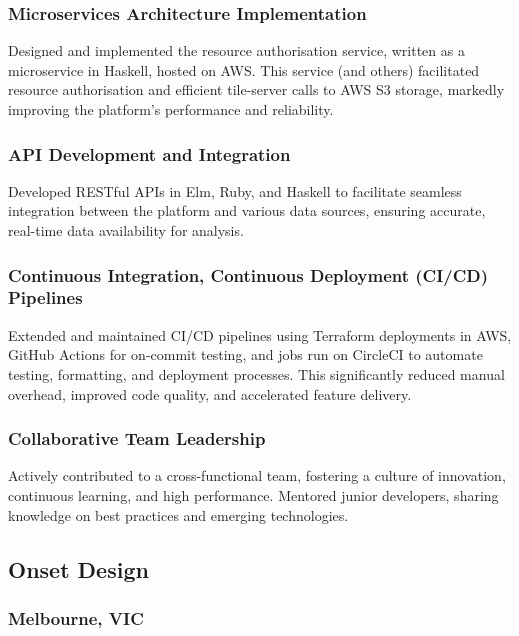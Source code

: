 \documentclass{article}
\begin{document}
\subsubsection{ Microservices Architecture Implementation }

Designed and implemented the resource authorisation service, written as a microservice in Haskell, hosted on AWS. This service (and others) facilitated resource authorisation and efficient tile-server calls to AWS S3 storage, markedly improving the platform's performance and reliability.

\subsubsection{ API Development and Integration }

Developed RESTful APIs in Elm, Ruby, and Haskell to facilitate seamless integration between the platform and various data sources, ensuring accurate, real-time data availability for analysis.

\subsubsection{ Continuous Integration, Continuous Deployment (CI/CD) Pipelines }

Extended and maintained CI/CD pipelines using Terraform deployments in AWS, GitHub Actions for on-commit testing, and jobs run on CircleCI to automate testing, formatting, and deployment processes. This significantly reduced manual overhead, improved code quality, and accelerated feature delivery.

\subsubsection{ Collaborative Team Leadership }

Actively contributed to a cross-functional team, fostering a culture of innovation, continuous learning, and high performance. Mentored junior developers, sharing knowledge on best practices and emerging technologies.

\subsection{ Onset Design }

\subsubsection{ Melbourne, VIC }
\end{document}
